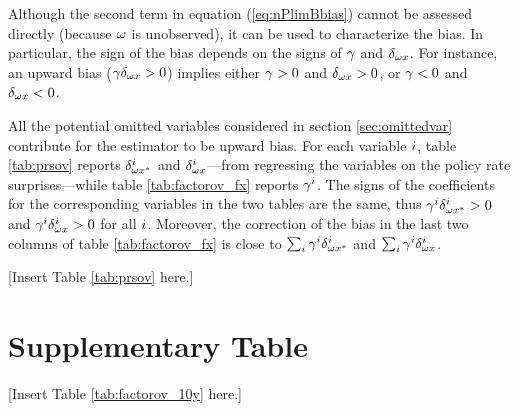 Although the second term in equation (\ref{eq:nPlimBbias}) cannot be assessed directly (because \(\omega\) is unobserved), it can be used to characterize the bias. In particular, the sign of the bias depends on the signs of \(\gamma\) and \(\delta_{\omega x}\). For instance, an upward bias (\(\gamma \delta_{\omega x} > 0\)) implies either \(\gamma > 0\) and \(\delta_{\omega x} > 0\), or \(\gamma < 0\) and \(\delta_{\omega x} < 0\). 

All the potential omitted variables considered in section \ref{sec:omittedvar} contribute for the estimator to be upward bias. For each variable \(i\), table \ref{tab:prsov} reports \(\delta_{\omega x^{*}}^{i}\) and \(\delta_{\omega x}^{i}\)---from regressing the variables on the policy rate surprises---while table \ref{tab:factorov_fx} reports \(\gamma^{i}\). The signs of the coefficients for the corresponding variables in the two tables are the same, thus \(\gamma^{i} \delta_{\omega x^{*}}^{i} > 0\) and \(\gamma^{i} \delta_{\omega x}^{i} > 0\) for all \(i\). Moreover, the correction of the bias in the last two columns of table \ref{tab:factorov_fx} is close to \(\sum_{i} \gamma^{i} \delta_{\omega x^{*}}^{i}\) and \(\sum_{i} \gamma^{i} \delta_{\omega x}^{i}\).
%
\begin{center}
	[Insert Table \ref{tab:prsov} here.]
\end{center}

\renewcommand{\thetable}{\thesection\arabic{table}}
\section{Supplementary Table} \label{sec:AppTables}

%
\begin{center}
	[Insert Table \ref{tab:factorov_10y} here.]
\end{center}

\newpage

\begin{landscape}
	\newpage
\end{landscape}